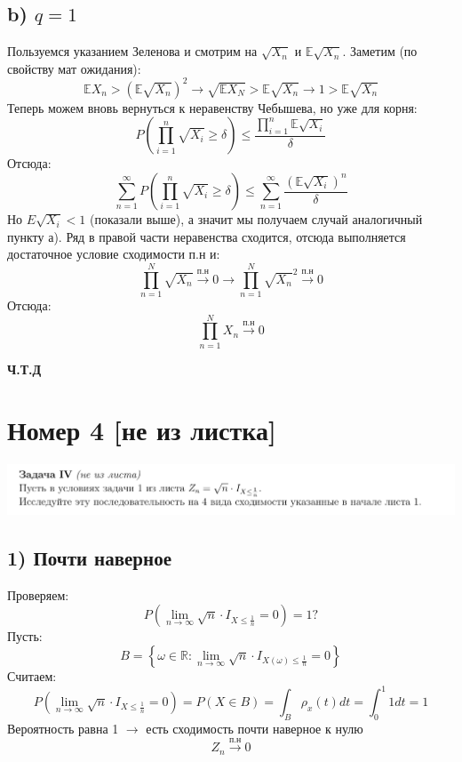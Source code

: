 \documentclass[a4paper,12pt]{article}
\begin{document}
\subsection*{b) $q = 1$}
Пользуемся указанием Зеленова и смотрим на $\sqrt{X_n}$ и $\mathbb{E} \sqrt{X_n}$. Заметим (по свойству мат ожидания):
\[
\mathbb{E} X_n > \left(\mathbb{E} \sqrt{X_n}\right)^2 \rightarrow \sqrt{\mathbb{E}X_N} >  \mathbb{E}\sqrt{X_n} \rightarrow 1 > \mathbb{E} \sqrt{X_n}
\]
Теперь можем вновь вернуться к неравенству Чебышева, но уже для корня:
\[
P
\left(
\prod_{i= 1}^{n} \sqrt{X_i}
\geq \delta
\right) 
\leq
\frac{\prod\limits_{i = 1}^{n} \mathbb{E} \sqrt{X_i}}{\delta}
\]
Отсюда:
\[
\sum_{n=1}^{\infty} P 
\left(
\prod_{i = 1}^{n} \sqrt{X_i}
\geq \delta
\right) 
\leq
\sum_{n=1}^{\infty}
\frac{\left(\mathbb{E} \sqrt{X_i}\right)^n}{\delta}
\]
Но $E \sqrt{X_i} < 1$ (показали выше), а значит мы получаем случай аналогичный пункту а). Ряд в правой части неравенства сходится, отсюда выполняется достаточное условие сходимости п.н и:
\[
\prod_{n = 1}^{N} \sqrt{X_n}   \overset{\text{п.н}}{\longrightarrow} 0  \longrightarrow \prod_{n = 1}^{N} \sqrt{X_n}^2 \overset{\text{п.н}}{\longrightarrow} 0 
\]
Отсюда:
\[
\prod_{n = 1}^{N} X_n \overset{\text{п.н}}{\longrightarrow} 0 
\]
\begin{center}
\textbf{Ч.Т.Д} 
\end{center}
\clearpage


\section*{Номер 4 [не из листка]}
\begin{center}
\includegraphics[scale=0.4]{3.png}
\end{center}
\subsection*{1) Почти наверное}
Проверяем:
\[
P \left(
\lim_{n \rightarrow \infty} \sqrt{n} \cdot I_{X \leq \frac{1}{n}} = 0
\right) = 1?
\]
Пусть:
\[
B = 
\left\{ 
\omega \in \mathbb{R} : \lim_{n \rightarrow \infty} \sqrt{n} \cdot I_{X(\omega) \leq \frac{1}{n}} = 0
\right\}
\]
Считаем:
\[
P \left(
\lim_{n \rightarrow \infty} \sqrt{n} \cdot I_{X \leq \frac{1}{n}} = 0
\right) = P \left(X \in B \right) = \int_B \rho_x(t) dt = 
\int_0^1 1 dt = 1 
\]
Вероятность равна 1 $\rightarrow$ есть сходимость почти наверное к нулю
\[ 
Z_n \overset{\text{п.н}}{\longrightarrow} 0 
\]
\end{document}
